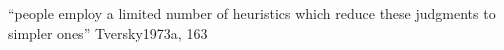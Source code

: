 










		



		``people employ a limited number of heuristics which reduce these judgments to simpler ones'' Tversky1973a, 163


